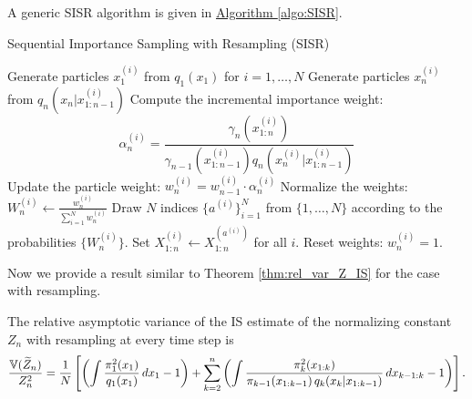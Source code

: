 A generic SISR algorithm is given in \hyperref[algo:SISR]{Algorithm \ref*{algo:SISR}}.
\begin{algorithm}[H]
	\caption{Sequential Importance Sampling with Resampling (SISR)}
	\label{algo:SISR}
	\begin{algorithmic}[1]
		\State Generate particles \(x_1^{(i)}\) from \( q_1(x_1)\) for \( i = 1, \dots, N \)
		\State Generate particles \(x_n^{(i)}\) from \(q_n(x_n\vert x_{1:n-1}^{(i)})\) 
		\State Compute the incremental importance weight: 
		\[
		\alpha_n^{(i)} = \frac{\gamma_n(x_{1:n}^{(i)})}{\gamma_{n-1}(x_{1:n-1}^{(i)}) q_n(x_n^{(i)} \vert x_{1:n-1}^{(i)})} 
		\] 
		\State Update the particle weight: \( w_n^{(i)} = w_{n-1}^{(i)} \cdot \alpha_n^{(i)} \)
		\EndFor
		\State Normalize the weights: \(W_n^{(i)} \leftarrow \frac{w_n^{(i)}}{\sum_{i=1}^N w_n^{(i)}} \)
		\State Draw \(N\) indices \(\{a^{(i)}\}_{i=1}^N\) from \(\{1,\dots,N\}\) according to the probabilities \(\{W_n^{(i)}\}\).
		\State Set \( X_{1:n}^{(i)} \leftarrow X_{1:n}^{(a^{(i)})} \) for all \( i \).
		\State Reset weights: $w_n^{(i)}=1$.
		\EndFor
	\end{algorithmic}
\end{algorithm}
Now we provide a result similar to Theorem \ref{thm:rel_var_Z_IS} for the case with resampling. 
\begin{comment}
	Thus, we can approximate $\widehat{\pi}_n(x_{1:n})$ by the resampled empirical measure 
	\[
	\overline{\pi}_n(x_{1:n}) \coloneq \frac{1}{N}\sum_{i=1}^{N} N_n^{(i)} \delta_{X_{1:n}^{(i)}}(x_{1:n}).
	\]
\end{comment}
\begin{comment}
	We can also estimate the \emph{incremental normalizing constant} \(Z_k/Z_{k-1}\) by
	\[
	\widehat{\frac{Z_k}{Z_{k-1}}}=\frac{1}{N} \sum_{i=1}^N \alpha_k(x_{1:k}^{(i)}).
	\]
	This will be useful in the sketch of the proof of Theorem \ref{thm:rel_asym_var_resampling}.
\end{comment}

\begin{theorem}
	\label{thm:rel_asym_var_resampling}
	The relative asymptotic variance of the IS estimate of the normalizing constant \(Z_n\) with resampling at every time step is
	\[
	\frac{\operatorname{\mathbb{V}}(\widetilde{Z}_n)}{Z_n^2}=\frac{1}{N}\left[\left(\int 	\frac{\pi_1^2(x_1)}{q_1(x_1)}\,dx_1-1\right)+\sum_{k=2}^n\left(\int \frac{\pi_k^2(x_{1:k})}{\pi_{k-1}(x_{1:k-1})\,q_k(x_k\vert x_{1:k-1})}\,dx_{k-1:k}-1\right)\right].
	\]
\end{theorem}

